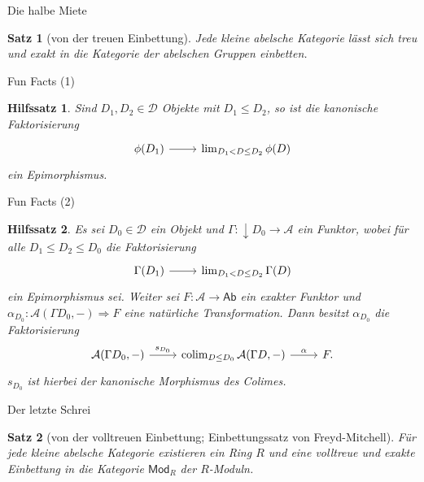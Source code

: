 \documentclass[usenames, dvipsnames]{beamer}
\newtheorem{hilfssatz}{Hilfssatz}
\newtheorem{satz}{Satz}
\newcommand\ccat\mathsf
\newcommand\cat\mathcal
\newcommand{\down}[1]{{\downarrow}#1}
\newcommand{\n}{\pgfmatrixnextcell}
\newcommand\nat\Rightarrow
\DeclareMathOperator{\colim}{colim}
\begin{document}
	\begin{frame}{Die halbe Miete}
		\begin{satz}[von der treuen Einbettung]\label{abeb}
			Jede kleine abelsche Kategorie lässt sich treu und exakt in die Kategorie
			der abelschen Gruppen einbetten.
		\end{satz}
	\end{frame}
	\begin{frame}{Fun Facts (1)}
		\begin{hilfssatz}
			Sind $D_1, D_2\in\cat{D}$ Objekte mit $D_1\leq D_2$, so ist die kanonische Faktorisierung
			\[
				\begin{tikzcd}
					\phi(D_1) \arrow[r] \n \lim_{D_1<D\leq D_2}\phi(D)
				\end{tikzcd}
			\]
			ein Epimorphismus.
		\end{hilfssatz}
	\end{frame}
	\begin{frame}{Fun Facts (2)}
		\begin{hilfssatz}
			Es sei $D_0\in\cat{D}$ ein Objekt und $\Gamma\colon \down{D_0}\to\cat{A}$
			ein Funktor, wobei für alle $D_1\leq D_2\leq D_0$ die Faktorisierung
			\[
				\begin{tikzcd}
					\Gamma(D_1) \arrow[r] \n \lim_{D_1<D\leq D_2} \Gamma(D)
				\end{tikzcd}
			\]
			ein Epimorphismus sei. Weiter sei $F\colon\cat{A}\to\ccat{Ab}$ ein exakter
			Funktor und $\alpha_{D_0}\colon \cat{A}(\Gamma D_0, {-})\nat F$
			eine natürliche Transformation. Dann besitzt $\alpha_{D_0}$ die
			Faktorisierung
			\[
				\begin{tikzcd}
					\cat{A}(\Gamma D_0, {-}) \arrow{r}{s_{D_0}} \n \colim_{D\leq D_0}\cat{A}(\Gamma D, {-}) \arrow{r}{\alpha} \n F.
				\end{tikzcd}
			\]
			$s_{D_0}$ ist hierbei der kanonische Morphismus des Colimes.
		\end{hilfssatz}
	\end{frame}
	\begin{frame}{Der letzte Schrei}
		\begin{satz}[von der volltreuen Einbettung; Einbettungssatz von Freyd-Mitchell]
			Für jede kleine abelsche Kategorie existieren ein Ring $R$ und eine volltreue
			und exakte Einbettung in die Kategorie $\ccat{Mod}_R$ der $R$-Moduln.
		\end{satz}
	\end{frame}
\end{document}
